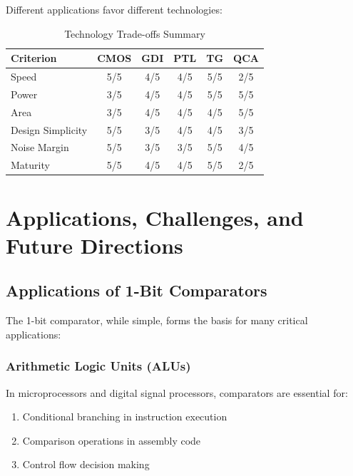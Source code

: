 \documentclass[12pt,a4paper,twoside]{report}
\begin{document}
Different applications favor different technologies:

\begin{table}[H]
\centering
\caption{Technology Trade-offs Summary}
\label{tab:tradeoffs}
\begin{tabularx}{\textwidth}{lccccc}
\toprule
Criterion & CMOS & GDI & PTL & TG & QCA \\
\midrule
Speed & 5/5 & 4/5 & 4/5 & 5/5 & 2/5 \\
Power & 3/5 & 4/5 & 4/5 & 5/5 & 5/5 \\
Area & 3/5 & 4/5 & 4/5 & 4/5 & 5/5 \\
Design Simplicity & 5/5 & 3/5 & 4/5 & 4/5 & 3/5 \\
Noise Margin & 5/5 & 3/5 & 3/5 & 5/5 & 4/5 \\
Maturity & 5/5 & 4/5 & 4/5 & 5/5 & 2/5 \\
\bottomrule
\end{tabularx}
\end{table}

\chapter{Applications, Challenges, and Future Directions}
\label{ch:applications}

\section{Applications of 1-Bit Comparators}

The 1-bit comparator, while simple, forms the basis for many critical applications:

\subsection{Arithmetic Logic Units (ALUs)}

In microprocessors and digital signal processors, comparators are essential for:
\begin{enumerate}
    \item Conditional branching in instruction execution
    \item Comparison operations in assembly code
    \item Control flow decision making
\end{enumerate}
\end{document}
